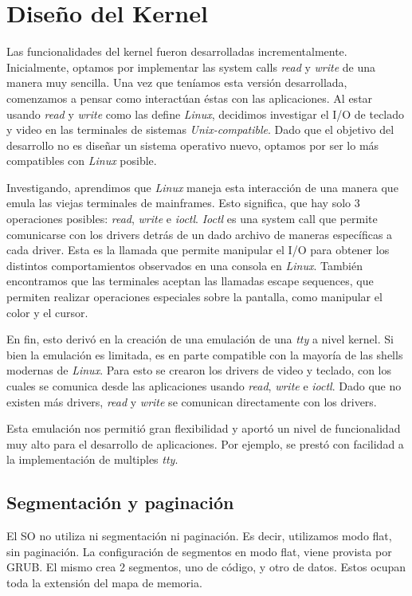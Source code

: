 \documentclass[a4paper,10pt]{article}
\begin{document}
\section{Diseño del Kernel}
    Las funcionalidades del kernel fueron desarrolladas incrementalmente.
    Inicialmente, optamos por implementar las system calls \textit{read} y \textit{write} de una manera muy sencilla.
    Una vez que teníamos esta versión desarrollada, comenzamos a pensar como interactúan éstas con las aplicaciones.
    Al estar usando \textit{read} y \textit{write} como las define \textit{Linux}, decidimos investigar el I/O de teclado y video en las terminales de sistemas \textit{Unix-compatible}.
    Dado que el objetivo del desarrollo no es diseñar un sistema operativo nuevo, optamos por ser lo más compatibles con \textit{Linux} posible.

    Investigando, aprendimos que \textit{Linux} maneja esta interacción de una manera que emula las viejas terminales de mainframes.
    Esto significa, que hay solo 3 operaciones posibles: \textit{read}, \textit{write} e \textit{ioctl}.
    \textit{Ioctl} es una system call que permite comunicarse con los drivers detrás de un dado archivo de maneras específicas a cada driver.
    Esta es la llamada que permite manipular el I/O para obtener los distintos comportamientos observados en una consola en \textit{Linux}.
    También encontramos que las terminales aceptan las llamadas escape sequences, que permiten realizar operaciones especiales sobre la pantalla, como manipular el color y el cursor.

    En fin, esto derivó en la creación de una emulación de una \textit{tty} a nivel kernel.
    Si bien la emulación es limitada, es en parte compatible con la mayoría de las shells modernas de \textit{Linux}.
    Para esto se crearon los drivers de video y teclado, con los cuales se comunica desde las aplicaciones usando \textit{read}, \textit{write} e \textit{ioctl}.
    Dado que no existen más drivers, \textit{read} y \textit{write} se comunican directamente con los drivers.

    Esta emulación nos permitió gran flexibilidad y aportó un nivel de funcionalidad muy alto para el desarrollo de aplicaciones.
    Por ejemplo, se prestó con facilidad a la implementación de multiples \textit{tty}.

    \subsection{Segmentación y paginación}
        El SO no utiliza ni segmentación ni paginación. 
        Es decir, utilizamos modo flat, sin paginación.
        La configuración de segmentos en modo flat, viene provista por GRUB.
        El mismo crea 2 segmentos, uno de código, y otro de datos.
        Estos ocupan toda la extensión del mapa de memoria.
\end{document}
